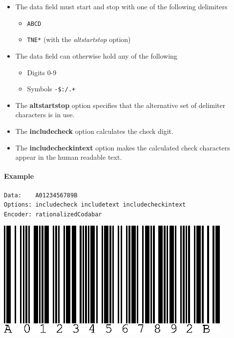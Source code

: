 \begin{itemize}
\tightlist
\item
  The data field must start and stop with one of the following
  delimiters

  \begin{itemize}
  \tightlist
  \item
    \texttt{ABCD}
  \item
    \texttt{TNE*} (with the \emph{altstartstop} option)
  \end{itemize}
\item
  The data field can otherwise hold any of the following

  \begin{itemize}
  \tightlist
  \item
    Digits 0-9
  \item
    Symbols \texttt{-\$:/.+}
  \end{itemize}
\item
  The \textbf{altstartstop} option specifies that the alternative set of
  delimiter characters is in use.
\item
  The \textbf{includecheck} option calculates the check digit.
\item
  The \textbf{includecheckintext} option makes the calculated check
  characters appear in the human readable text.
\end{itemize}

\hypertarget{example-18}{%
\paragraph{Example}\label{example-18}}

\begin{verbatim}
Data:    A0123456789B
Options: includecheck includetext includecheckintext
Encoder: rationalizedCodabar
\end{verbatim}

\includegraphics{images/codabar-1.eps}

